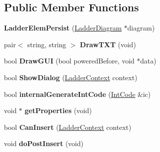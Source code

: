 \subsection*{Public Member Functions}
\begin{DoxyCompactItemize}
\item 
\hypertarget{class_ladder_elem_persist_a497136effcfffa1f9871e6661ee7aff6}{{\bfseries Ladder\-Elem\-Persist} (\hyperlink{class_ladder_diagram}{Ladder\-Diagram} $\ast$diagram)}\label{class_ladder_elem_persist_a497136effcfffa1f9871e6661ee7aff6}

\item 
\hypertarget{class_ladder_elem_persist_a7a91ae65a2459792eadcaab7c7e3e9b7}{pair$<$ string, string $>$ {\bfseries Draw\-T\-X\-T} (void)}\label{class_ladder_elem_persist_a7a91ae65a2459792eadcaab7c7e3e9b7}

\item 
\hypertarget{class_ladder_elem_persist_ac33ec799ca70807b6d0628803d42da8b}{bool {\bfseries Draw\-G\-U\-I} (bool powered\-Before, void $\ast$data)}\label{class_ladder_elem_persist_ac33ec799ca70807b6d0628803d42da8b}

\item 
\hypertarget{class_ladder_elem_persist_ad493c8ed0deec93e523149b8be32cd51}{bool {\bfseries Show\-Dialog} (\hyperlink{struct_ladder_context}{Ladder\-Context} context)}\label{class_ladder_elem_persist_ad493c8ed0deec93e523149b8be32cd51}

\item 
\hypertarget{class_ladder_elem_persist_a78b662e1699270fa77744e3d7137667b}{bool {\bfseries internal\-Generate\-Int\-Code} (\hyperlink{class_int_code}{Int\-Code} \&ic)}\label{class_ladder_elem_persist_a78b662e1699270fa77744e3d7137667b}

\item 
\hypertarget{class_ladder_elem_persist_a588040dbbcea827f4a4252ab32e27a13}{void $\ast$ {\bfseries get\-Properties} (void)}\label{class_ladder_elem_persist_a588040dbbcea827f4a4252ab32e27a13}

\item 
\hypertarget{class_ladder_elem_persist_a71871772ac873e13241d0185eeb9decb}{bool {\bfseries Can\-Insert} (\hyperlink{struct_ladder_context}{Ladder\-Context} context)}\label{class_ladder_elem_persist_a71871772ac873e13241d0185eeb9decb}

\item 
\hypertarget{class_ladder_elem_persist_a375bca73d5cd908028480b9abebbcf91}{void {\bfseries do\-Post\-Insert} (void)}\label{class_ladder_elem_persist_a375bca73d5cd908028480b9abebbcf91}


\end{DoxyCompactItemize}

